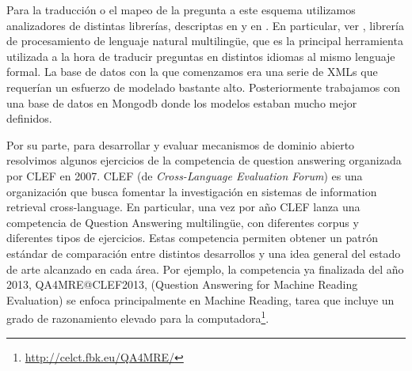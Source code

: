 Para la traducción o el mapeo de la pregunta a este esquema utilizamos analizadores de distintas librerías, descriptas en  y en . En particular, ver , librería de procesamiento de lenguaje natural multilingüe, que es la principal herramienta utilizada a la hora de traducir preguntas en distintos idiomas al mismo lenguaje formal. La base de datos con la que comenzamos era una serie de XMLs que requerían un esfuerzo de modelado bastante alto. Posteriormente trabajamos con una base de datos en Mongodb donde los modelos estaban mucho mejor definidos.


Por su parte, para desarrollar y evaluar mecanismos de dominio abierto resolvimos algunos ejercicios de la competencia de question answering organizada por CLEF
en 2007. CLEF (de \textit{Cross-Language Evaluation Forum}) es una organización que busca fomentar la investigación en sistemas de information retrieval cross-language. En particular, una vez por año CLEF lanza una competencia de Question Answering multilingüe, con diferentes corpus y diferentes tipos de ejercicios. Estas competencia permiten obtener un patrón estándar de comparación entre distintos desarrollos y una idea general del estado de arte alcanzado en cada área.
Por ejemplo, la competencia ya finalizada del año 2013, QA4MRE@CLEF2013, (Question Answering for Machine Reading Evaluation) se enfoca principalmente en Machine Reading, tarea que incluye un grado de razonamiento elevado para la computadora\footnote{\url{http://celct.fbk.eu/QA4MRE/}}.


